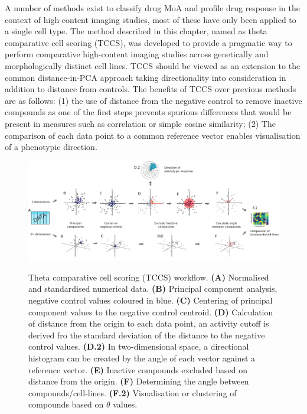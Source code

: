 \documentclass[a4paper,11pt,twoside,openright]{scrbook}
\begin{document}
A number of methods exist to classify drug MoA and profile drug response in the context of high-content imaging studies, most of these have only been applied to a single cell type.
The method described in this chapter, named as theta comparative cell scoring (TCCS), was developed to provide a pragmatic way to perform comparative high-content imaging studies across genetically and morphologically distinct cell lines.
TCCS should be viewed as an extension to the common distance-in-PCA approach taking directionality into consideration in addition to distance from controls.
The benefits of TCCS over previous methods are as follows: (1) the use of distance from the negative control to remove inactive compounds as one of the first steps prevents spurious differences that would be present in measures such as correlation or simple cosine similarity; (2) The comparison of each data point to a common reference vector enables visualisation of a phenotypic direction.


\begin{figure}
    \captionsetup{width=0.8\textwidth}
    \caption[TCCS workflow]{
Theta comparative cell scoring (TCCS) workflow.
\textbf{(A)} Normalised and standardised numerical data.
    \textbf{(B)} Principal component analysis, negative control values coloured in blue.
    \textbf{(C)} Centering of principal component values to the negative control centroid.
    \textbf{(D)} Calculation of distance from the origin to each data point, an activity cutoff is derived fro the standard deviation of the distance to the negative control values.
    \textbf{(D.2)} In two-dimensional space, a directional histogram can be created by the angle of each vector against a reference vector.
    \textbf{(E)} Inactive compounds excluded based on distance from the origin.
    \textbf{(F)} Determining the angle between compounds/cell-lines.
    \textbf{(F.2)} Visualisation or clustering of compounds based on $\theta$ values.
}
    \includegraphics[scale=1.0]{figs/ch3thetaWorkflow}
    \label{figure:theta_workflow}
\end{figure}
\end{document}
